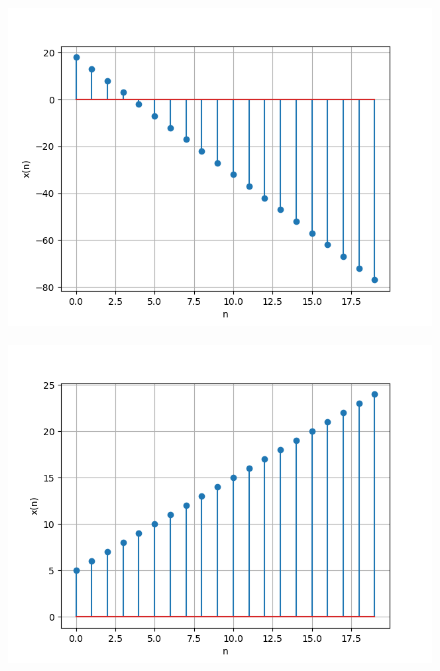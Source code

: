 \documentclass[journal,12pt,twocolumn]{IEEEtran}
\theoremstyle{remark}
\begin{document}
\begin{figure}[h]
      \centering
       \includegraphics[width=1\linewidth]{ncert-maths/10/5/2/3/figs/plot2.png} %
        \caption{}
    \end{figure}
    
\begin{figure}[h]
      \centering
       \includegraphics[width=1\linewidth]{ncert-maths/10/5/2/3/figs/plot3.png} %
        \caption{}
    \end{figure}
    
\end{document}

